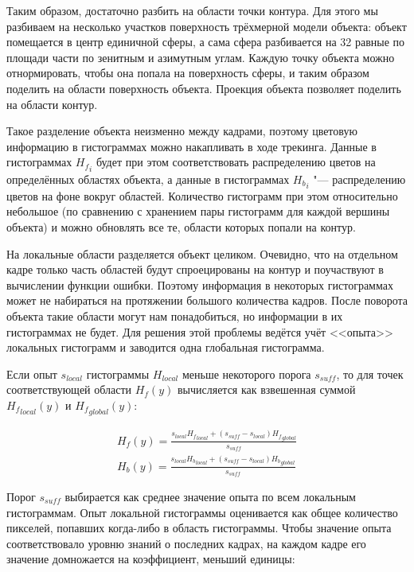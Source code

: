 Таким образом, достаточно разбить на области точки контура.
Для этого мы разбиваем на несколько участков поверхность трёхмерной модели
объекта: объект помещается в центр единичной сферы, а сама сфера разбивается на
32 равные по площади части по зенитным и азимутным углам.
Каждую точку объекта можно отнормировать, чтобы она попала на поверхность
сферы, и таким образом поделить на области поверхность объекта.
Проекция объекта позволяет поделить на области контур.

Такое разделение объекта неизменно между кадрами, поэтому цветовую информацию в
гистограммах можно накапливать в ходе трекинга.
Данные в гистограммах ${H_f}_i$ будет при этом соответствовать распределению
цветов на определённых областях объекта, а данные в гистограммах ${H_b}_i$ "---
распределению цветов на фоне вокруг областей.
Количество гистограмм при этом относительно небольшое (по сравнению с хранением
пары гистограмм для каждой вершины объекта) и можно обновлять все те, области
которых попали на контур.

На локальные области разделяется объект целиком. 
Очевидно, что на отдельном кадре только часть областей будут спроецированы на
контур и поучаствуют в вычислении функции ошибки.
Поэтому информация в некоторых гистограммах может не набираться на протяжении
большого количества кадров.
После поворота объекта такие области могут нам понадобиться, но информации в их
гистограммах не будет.
Для решения этой проблемы ведётся учёт <<опыта>> локальных гистограмм и
заводится одна глобальная гистограмма.

Если опыт $s_{local}$ гистограммы $H_{local}$ меньше некоторого порога
$s_{suff}$, то для точек соответствующей области $H_f(y)$ вычисляется как
взвешенная суммой ${H_f}_{local}(y)$ и ${H_f}_{global}(y)$:

\begin{equation}
\label{eqn:histo_skill}
\begin{array}{c}
H_f(y) = \frac{s_{local} {H_f}_{local} + (s_{suff} - s_{local})
{H_f}_{global}}{s_{suff}} \\
H_b(y) = \frac{s_{local} {H_b}_{local} + (s_{suff} - s_{local})
{H_b}_{global}}{s_{suff}}
\end{array}
\end{equation}

Порог $s_{suff}$ выбирается как среднее значение опыта по всем локальным
гистограммам.
Опыт локальной гистограммы оценивается как общее количество пикселей, попавших
когда-либо в область гистограммы.
Чтобы значение опыта соответствовало уровню знаний о последних кадрах, на
каждом кадре его значение домножается на коэффициент, меньший единицы:

